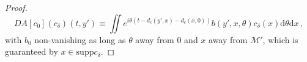 \documentclass[
	fontsize=11pt, 
	twoside=false, 
	abstract=true, 
	a4paper,
]{scrartcl}
\newcommand{\dd}{\mathrm{d}}
\newcommand{\abs}[1]{\left\lvert#1\right\rvert}
\newcommand{\supp}{\mathrm{supp}}
\newcommand{\ud}[1]{\underline{#1}}
\begin{document}
\begin{proof}
%
%
%
%
	\begin{equation}\label{eq:finalFIO}
		DA[c_0](c_\delta)(t,y')\equiv \iint e^{i\theta(t-d_c(y',x)-d_c(x,0))}b(y',x,\theta)c_\delta(x)\dd\theta\dd x\,,
	\end{equation}
	with $b_0$ non-vanishing as long as $\theta$ away from $0$ and $x$ away from $\mathcal{M}'$, which is guaranteed by $x \in \supp c_\delta$.


\end{proof}
\end{document}
